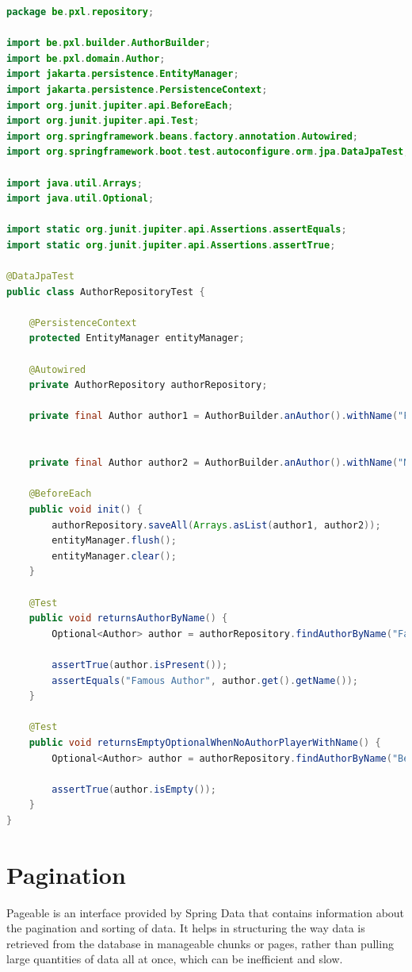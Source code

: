 \begin{lstlisting}[frame=single, language=java]
package be.pxl.repository;

import be.pxl.builder.AuthorBuilder;
import be.pxl.domain.Author;
import jakarta.persistence.EntityManager;
import jakarta.persistence.PersistenceContext;
import org.junit.jupiter.api.BeforeEach;
import org.junit.jupiter.api.Test;
import org.springframework.beans.factory.annotation.Autowired;
import org.springframework.boot.test.autoconfigure.orm.jpa.DataJpaTest;

import java.util.Arrays;
import java.util.Optional;

import static org.junit.jupiter.api.Assertions.assertEquals;
import static org.junit.jupiter.api.Assertions.assertTrue;

@DataJpaTest
public class AuthorRepositoryTest {

	@PersistenceContext
	protected EntityManager entityManager;

	@Autowired
	private AuthorRepository authorRepository;

	private final Author author1 = AuthorBuilder.anAuthor().withName("Famous Author").build();


	private final Author author2 = AuthorBuilder.anAuthor().withName("Not So Famous Author").build();

	@BeforeEach
	public void init() {
		authorRepository.saveAll(Arrays.asList(author1, author2));
		entityManager.flush();
		entityManager.clear();
	}

	@Test
	public void returnsAuthorByName() {
		Optional<Author> author = authorRepository.findAuthorByName("Famous Author");

		assertTrue(author.isPresent());
		assertEquals("Famous Author", author.get().getName());
	}

	@Test
	public void returnsEmptyOptionalWhenNoAuthorPlayerWithName() {
		Optional<Author> author = authorRepository.findAuthorByName("Bestseller Author");

		assertTrue(author.isEmpty());
	}
}
\end{lstlisting}


\section{Pagination}

Pageable is an interface provided by Spring Data that contains information about the pagination and sorting of data. It helps in structuring the way data is retrieved from the database in manageable chunks or pages, rather than pulling large quantities of data all at once, which can be inefficient and slow.


